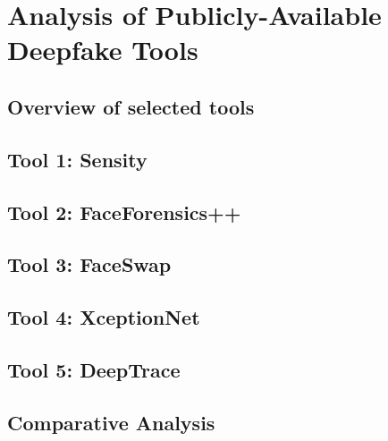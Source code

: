 
\chapter{Analysis of Publicly-Available Deepfake Tools}\label{chapter:tools}

\section{Overview of selected tools}\label{chapter:overview}
\section{Tool 1: Sensity}\label{chapter:sensity}
\section{Tool 2: FaceForensics++}\label{chapter:faceforensics}
\section{Tool 3: FaceSwap}\label{chapter:faceswap}
\section{Tool 4: XceptionNet}\label{chapter:xceptionnet}
\section{Tool 5: DeepTrace}\label{chapter:deeptrace}
\section{Comparative Analysis}\label{chapter:analysis}